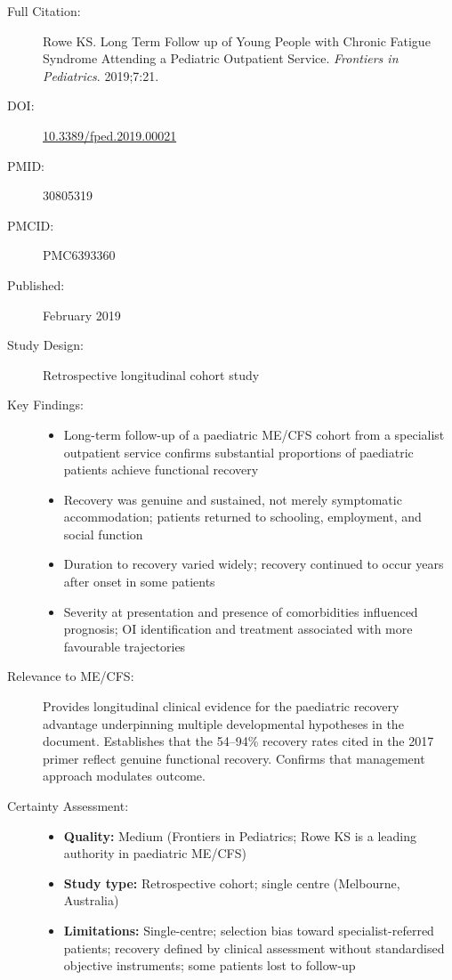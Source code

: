 \begin{description}
    \item[Full Citation:] Rowe KS. Long Term Follow up of Young People with Chronic Fatigue Syndrome Attending a Pediatric Outpatient Service. \textit{Frontiers in Pediatrics}. 2019;7:21.
    \item[DOI:] \href{https://doi.org/10.3389/fped.2019.00021}{10.3389/fped.2019.00021}
    \item[PMID:] 30805319
    \item[PMCID:] PMC6393360
    \item[Published:] February 2019
    \item[Study Design:] Retrospective longitudinal cohort study
    \item[Key Findings:]
    \begin{itemize}
        \item Long-term follow-up of a paediatric ME/CFS cohort from a specialist outpatient service confirms substantial proportions of paediatric patients achieve functional recovery
        \item Recovery was genuine and sustained, not merely symptomatic accommodation; patients returned to schooling, employment, and social function
        \item Duration to recovery varied widely; recovery continued to occur years after onset in some patients
        \item Severity at presentation and presence of comorbidities influenced prognosis; OI identification and treatment associated with more favourable trajectories
    \end{itemize}
    \item[Relevance to ME/CFS:] Provides longitudinal clinical evidence for the paediatric recovery advantage underpinning multiple developmental hypotheses in the document. Establishes that the 54--94\% recovery rates cited in the 2017 primer reflect genuine functional recovery. Confirms that management approach modulates outcome.
    \item[Certainty Assessment:]
    \begin{itemize}
        \item \textbf{Quality:} Medium (Frontiers in Pediatrics; Rowe KS is a leading authority in paediatric ME/CFS)
        \item \textbf{Study type:} Retrospective cohort; single centre (Melbourne, Australia)
        \item \textbf{Limitations:} Single-centre; selection bias toward specialist-referred patients; recovery defined by clinical assessment without standardised objective instruments; some patients lost to follow-up
    \end{itemize}
\end{description}

